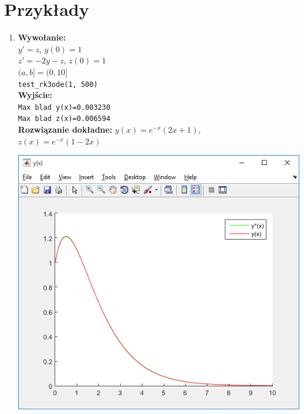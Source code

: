 \documentclass[]{article}
\begin{document}
\section{Przykłady}
\begin{enumerate}
\item \textbf{Wywołanie:}\\
$y'=z$,\hspace{16mm}      $y(0)=1$\\
$z'=-2y-z$,\hspace{5mm}    $z(0)=1$\\
$(a,b] = (0,10]$
\\
\verb|test_rk3ode(1, 500)|
\\\textbf{Wyjście:}\\
\verb|Max blad y(x)=0.003230|\\
\verb|Max blad z(x)=0.006594|\\
\textbf{Rozwiązanie dokładne:} $y(x)= e^{-x}(2x+1)$, \\$z(x)= e^{-x}(1-2x)$
\begin{center}
	\includegraphics[scale=0.7]{y1.png}\\

\end{center}
\end{enumerate}
\end{document}
